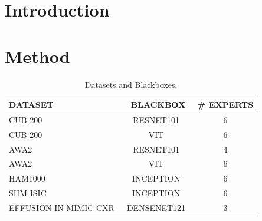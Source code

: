 \documentclass[nohyperref]{article}
\theoremstyle{plain}
\theoremstyle{definition}
\theoremstyle{remark}
\begin{document}
\printAffiliationsAndNotice{} %

\begin{abstract}

% 
\end{abstract}

\section{Introduction}
% 


% 


\section{Method}
\label{sec:method}
% 


\begin{table}[t]
\caption{Datasets and Blackboxes.}
\fontsize{5.2pt}{0.30cm}\selectfont
\label{tab:dataset}
\vskip 0.1in
\begin{center}
\begin{tabular}{lcc}
\toprule
DATASET & BLACKBOX & \# EXPERTS  \\
\midrule
CUB-200~\cite{wah2011caltech}  & RESNET101~\cite{he2016deep}& 6 \\
CUB-200~\cite{wah2011caltech}  & VIT~\cite{wang2021feature}&  6 \\
AWA2~\cite{xian2018zero} & RESNET101~\cite{he2016deep} & 4\\
AWA2~\cite{xian2018zero} & VIT~\cite{wang2021feature} & 6\\
HAM1000~\cite{tschandl2018ham10000}    & INCEPTION~\cite{szegedy2015going}& 6\\
SIIM-ISIC~\cite{rotemberg2021patient}    & INCEPTION~\cite{szegedy2015going} & 6\\
EFFUSION IN MIMIC-CXR~\cite{12_johnsonmimic}    & DENSENET121~\cite{huang2017densely} & 3\\
\bottomrule
\end{tabular}
\end{center}
\vskip -0.1in
\end{table}
\end{document}
